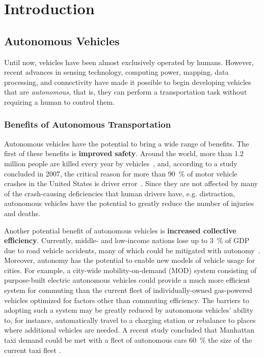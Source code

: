 \chapter{Introduction}

\section{Autonomous Vehicles}

Until now, vehicles have been almost exclusively operated by humans.
However, recent advances in sensing technology, computing power, mapping, data processing, and connectivity have made it possible to begin developing vehicles that are \emph{autonomous}, that is, they can perform a transportation task without requiring a human to control them.

\subsection{Benefits of Autonomous Transportation} \label{sec:benefits}

Autonomous vehicles have the potential to bring a wide range of benefits.
The first of these benefits is \textbf{improved safety}.
Around the world, more than 1.2 million people are killed every year by vehicles~\cite{who2015global}, and, according to a study concluded in 2007, the critical reason for more than \SI{90}{\percent} of motor vehicle crashes in the United States is driver error~\cite{nhtsa2015critical}.
Since they are not affected by many of the crash-causing deficiencies that human drivers have, e.g. distraction, autonomous vehicles have the potential to greatly reduce the number of injuries and deaths.

Another potential benefit of autonomous vehicles is \textbf{increased collective efficiency}.
Currently, middle- and low-income nations lose up to \SI{3}{\percent} of GDP due to road vehicle accidents, many of which could be mitigated with autonomy~\cite{who2015global}.
Moreover, autonomy has the potential to enable new models of vehicle usage for cities.
For example, a city-wide mobility-on-demand (MOD) system consisting of purpose-built electric autonomous vehicles could provide a much more efficient system for commuting than the current fleet of individually-owned gas-powered vehicles optimized for factors other than commuting efficiency.
The barriers to adopting such a system may be greatly reduced by autonomous vehicles' ability to, for instance, automatically travel to a charging station or rebalance to places where additional vehicles are needed.
A recent study concluded that Manhattan taxi demand could be met with a fleet of autonomous cars \SI{60}{\percent} the size of the current taxi fleet \cite{RZ-MP:15_MODa}.

